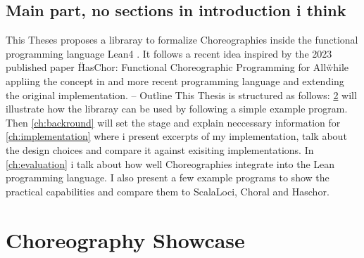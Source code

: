 \section{Main part, no sections in introduction i think}
This Theses proposes a libraray to formalize Choreographies inside the functional programming language Lean4 \cite{github_lean4}. It follows a recent idea inspired by the 2023 published paper \"HasChor: Functional Choreographic Programming for All\" while appliing the concept in and more recent programming language and extending the original implementation.
-- Outline
This Thesis is structured as follows: \cref{ch:showcase} will illustrate how the libraray can be used by following a simple example program. Then \cref{ch:backround} will set the stage and explain neccessary information for \cref{ch:implementation} where i present excerpts of my implementation, talk about the design choices and compare it against exisiting implementations.
In \cref{ch:evaluation} i talk about how well Choreographies integrate into the Lean programming language. I also present a few example programs to show the practical capabilities and compare them to ScalaLoci, Choral and Haschor.

\chapter{Choreography Showcase}
\label{ch:showcase}



